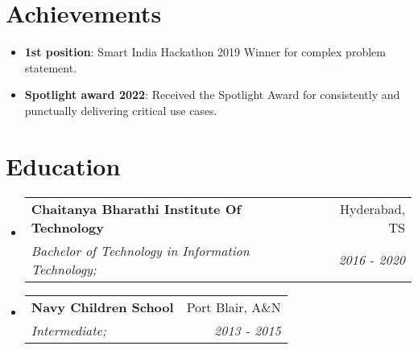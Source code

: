 \documentclass[letterpaper,11pt]{article}
\makeatletter
\newcommand{\resumeSubheading}[4]{
\vspace{-1pt}\item
\begin{tabular*}{0.97\textwidth}{l@{\extracolsep{\fill}}r}
\textbf{#1} & #2 \\
\textit{\small#3} & \textit{\small #4} \\
\end{tabular*}\vspace{-5pt}
}
\newcommand{\resumeItem}[2]{\item\small{\textbf{#1}{: #2 \vspace{-2pt}}}}
\newcommand{\resumeSubHeadingListStart}{\begin{itemize}[leftmargin=*]}
\newcommand{\resumeSubHeadingListEnd}{\end{itemize}}
\makeatother
\begin{document}
\section{Achievements}
\resumeSubHeadingListStart
  \resumeItem{1st position}
{Smart India Hackathon 2019 Winner for complex problem statement.}
\resumeItem{Spotlight award 2022}
{Received the Spotlight Award for consistently and punctually delivering critical use cases.}
  \resumeSubHeadingListEnd




\section{Education}
  \resumeSubHeadingListStart
  \resumeSubheading
  {Chaitanya Bharathi Institute Of Technology}{Hyderabad, TS}
  {Bachelor of Technology in Information Technology;}{2016 - 2020}
  \resumeSubheading
  {Navy Children School}{Port Blair, A\&N}
  {Intermediate;}{2013 - 2015}
  \resumeSubHeadingListEnd


\end{document}
